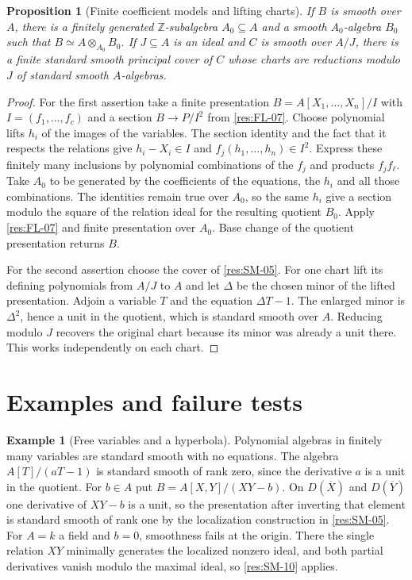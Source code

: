 \documentclass[11pt,oneside,openany]{book}
\newtheorem{proposition}[theorem]{Proposition}
\theoremstyle{definition}
\newtheorem{example}[theorem]{Example}
\theoremstyle{remark}
\begin{document}
\begin{proposition}[Finite coefficient models and lifting charts]
\label{res:SM-15}
If $B$ is smooth over $A$, there is a finitely generated
$\mathbb Z$-subalgebra $A_0\subseteq A$ and a smooth $A_0$-algebra
$B_0$ such that $B\simeq A\otimes_{A_0}B_0$.
If $J\subseteq A$ is an ideal and $C$ is smooth over $A/J$,
there is a finite standard smooth principal cover of $C$
whose charts are reductions modulo $J$ of standard smooth
$A$-algebras.
\end{proposition}

\begin{proof}
For the first assertion take a finite presentation
$B=A[X_1,\ldots,X_n]/I$ with $I=(f_1,\ldots,f_c)$ and a
section $B\to P/I^2$ from \ref{res:FL-07}. Choose polynomial
lifts $h_i$ of the images of the variables. The section
identity and the fact that it respects the relations give
$h_i-X_i\in I$ and $f_j(h_1,\ldots,h_n)\in I^2$.
Express these finitely many inclusions by polynomial
combinations of the $f_j$ and products $f_jf_\ell$.
Take $A_0$ to be generated by the coefficients of the equations,
the $h_i$ and all those combinations. The identities remain
true over $A_0$, so the same $h_i$ give a section modulo the
square of the relation ideal for the resulting quotient $B_0$.
Apply \ref{res:FL-07} and finite presentation over $A_0$.
Base change of the quotient presentation returns $B$.

For the second assertion choose the cover of \ref{res:SM-05}.
For one chart lift its defining polynomials from $A/J$ to $A$
and let $\Delta$ be the chosen minor of the lifted presentation.
Adjoin a variable $T$ and the equation $\Delta T-1$. The
enlarged minor is $\Delta^2$, hence a unit in the quotient,
which is standard smooth over $A$. Reducing modulo $J$
recovers the original chart because its minor was already a
unit there. This works independently on each chart.
\end{proof}

\section{Examples and failure tests}

\begin{example}[Free variables and a hyperbola]
\label{res:SM-16}
Polynomial algebras in finitely many variables are standard
smooth with no equations. The algebra $A[T]/(aT-1)$ is
standard smooth of rank zero, since the derivative $a$ is a
unit in the quotient. For $b\in A$ put
$B=A[X,Y]/(XY-b)$. On $D(\overline X)$ and $D(\overline Y)$
one derivative of $XY-b$ is a unit, so the presentation after
inverting that element is standard smooth of rank one
by the localization construction in \ref{res:SM-05}.
For $A=k$ a field and $b=0$, smoothness fails at the origin.
There the single relation $XY$ minimally generates the
localized nonzero ideal, and both partial derivatives
vanish modulo the maximal ideal, so \ref{res:SM-10} applies.
\end{example}
\end{document}
